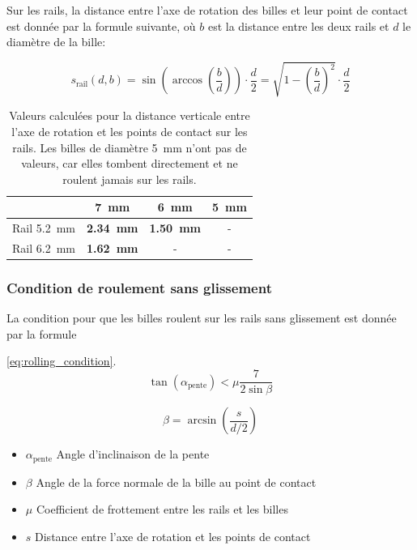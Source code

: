 Sur les rails, la distance entre l'axe de rotation des billes et leur point de contact est donnée par la formule suivante, où $b$ est la distance entre les deux rails et $d$ le diamètre de la bille:


\[s_{\text{rail}}(d,b) = \sin\left(\arccos\left(\frac{b}{d}\right)\right) \cdot \frac{d}{2} = \sqrt{1-\left(\frac{b}{d}\right)^{2}} \cdot \frac{d}{2}\]

\begin{table}[htbp]
    \centering
    \begin{tabular}{|c|c|c|c|}
        \hline
         & \SI{7}{\mm} & \SI{6}{\mm} & \SI{5}{\mm} \\
        \hline
        Rail \SI{5.2}{\mm}& \textbf{\SI{2.34}{\mm}} & \textbf{\SI{1.50}{\mm}} & - \\
        \hline
        Rail \SI{6.2}{\mm}& \textbf{\SI{1.62}{\mm}} & - & - \\
        \hline
    \end{tabular}
    \caption{Valeurs calculées pour la distance verticale entre l'axe de rotation et les points de contact sur les rails. Les billes de diamètre \SI{5}{\mm} n'ont pas de valeurs, car elles tombent directement et ne roulent jamais sur les rails.}
    \label{tab:distance_rails}
\end{table}

\subsubsection{Condition de roulement sans glissement}
La condition pour que les billes roulent sur les rails sans glissement est donnée par la formule

\ref{eq:rolling_condition}.
\begin{equation}
    \tan(\alpha_{\text{pente}}) < \mu \frac{7}{2\sin{\beta}}
    \label{eq:rolling_condition}
\end{equation}

\[\beta = \arcsin\left(\frac{s}{d/2}\right)\]


\begin{itemize}[label={}, noitemsep]
	\item $\alpha_{\text{pente}}$ \tabto{\tabtoX} Angle d'inclinaison de la pente
	\item $\beta$ \tabto{\tabtoX} Angle de la force normale de la bille au point de contact
	\item $\mu$ \tabto{\tabtoX} Coefficient de frottement entre les rails et les billes
	\item $s$ \tabto{\tabtoX} Distance entre l'axe de rotation et les points de contact
\end{itemize}

